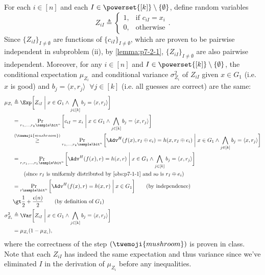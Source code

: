 \begin{answer}[iii]
    For each $i\in[n]$ and each $I\in \powerset{[k]}\setminus\{\emptyset\}$, define random variables 
    \[
        Z_{iI}\triangleq \begin{cases}
            1, & \text{if } c_{iI} = x_i\\
            0, & \text{otherwise}
        \end{cases}.
    \] 
    Since $\{Z_{iI}\}_{I\neq \emptyset}$ are functions of $\{c_{iI}\}_{I\neq \emptyset}$, which are proven to be pairwise independent in subproblem (ii), by \autoref{lemma:p7-2-1}, $\{Z_{iI}\}_{I\neq \emptyset}$ are also pairwise independent. Moreover, for any $i\in[n]$ and $I\in \powerset{[k]}\setminus\{\emptyset\}$, the conditional expectation $\mu_{Z_i}$ and conditional variance $\sigma_{Z_i}^2$ of $Z_{iI}$ given $x\in G_1$ (i.e. $x$ is good) and $b_j=\langle x, r_j\rangle \;\;\forall j\in[k]$ (i.e. all guesses are correct) are the same:
    \begin{align*}
        \mu_{Z_i} &\triangleq \Exp\bigg[ Z_{iI} \biggm\vert x\in G_1 \land \bigwedge_{j\in[k]} b_j = \langle x,r_j \rangle \biggr]\\
        &=  \Pr_{r_1,\ldots,r_k\sample\bit^n}\bigg[ c_{iI}=x_i \biggm\vert x\in G_1 \land \bigwedge_{j\in[k]} b_j = \langle x,r_j \rangle \biggr]\\
        &\stackrel{(\twemoji{mushroom})}{\ge}  \Pr_{r_1,\ldots,r_k\sample\bit^n}\bigg[ \Adv^H(f(x), r_I\oplus e_i) = h(x, r_I\oplus e_i) \biggm\vert x\in G_1 \land \bigwedge_{j\in[k]} b_j = \langle x,r_j \rangle \biggr]\\
        &=  \Pr_{r, r_1,\ldots,r_k\sample\bit^n}\bigg[ \Adv^H(f(x), r) = h(x, r) \biggm\vert x\in G_1 \land \bigwedge_{j\in[k]} b_j = \langle x,r_j \rangle \biggr]\\
        &\qquad (\textrm{since $r_I$ is uniformly distributed by \autoref{obs:p7-1-1} and so is $r_I\oplus e_i$})\\
        &=  \Pr_{r\sample\bit^n}\bigg[ \Adv^H(f(x), r) = h(x, r) \biggm\vert x\in G_1 \biggr]
        \qquad (\textrm{by independence})\\
        &\gt \frac{1}{2}+\frac{\epsilon(n)}{2}
        \qquad (\textrm{by definition of $G_1$})\\
        \sigma_{Z_i}^2 &\triangleq \Var\bigg[ Z_{iI} \biggm\vert x\in G_1 \land \bigwedge_{j\in[k]} b_j = \langle x,r_j \rangle \biggr]\\
        &= \mu_{Z_i} (1-\mu_{Z_i}),
    \end{align*}
    where the correctness of the step $(\twemoji{mushroom})$ is proven in class. Note that each $Z_{iI}$ has indeed the same expectation and thus variance since we've eliminated $I$ in the derivation of $\mu_{Z_i}$ before any inequalities. 


\end{answer}
